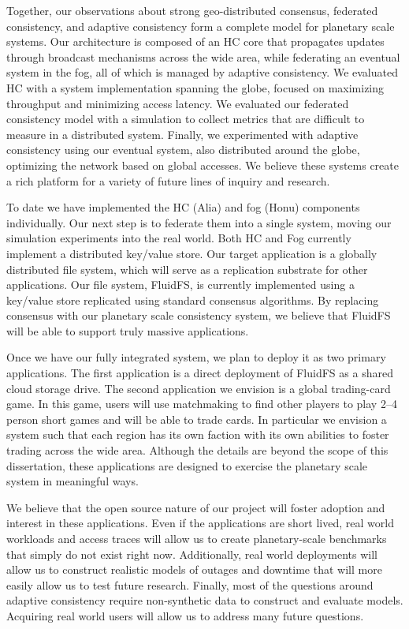 Together, our observations about strong geo-distributed consensus, federated consistency, and adaptive consistency form a complete model for planetary scale systems.
Our architecture is composed of an HC core that propagates updates through broadcast mechanisms across the wide area, while federating an eventual system in the fog, all of which is managed by adaptive consistency.
We evaluated HC with a system implementation spanning the globe, focused on maximizing throughput and minimizing access latency.
We evaluated our federated consistency model with a simulation to collect metrics that are difficult to measure in a distributed system.
Finally, we experimented with adaptive consistency using our eventual system, also distributed around the globe, optimizing the network based on global accesses.
We believe these systems create a rich platform for a variety of future lines of inquiry and research.

To date we have implemented the HC (Alia) and fog (Honu) components individually.
Our next step is to federate them into a single system, moving our simulation experiments into the real world.
Both HC and Fog currently implement a distributed key/value store.
Our target application is a globally distributed file system, which will serve as a replication substrate for other applications.
Our file system, FluidFS, is currently implemented using a key/value store replicated using standard consensus algorithms.
By replacing consensus with our planetary scale consistency system, we believe that FluidFS will be able to support truly massive applications.

Once we have our fully integrated system, we plan to deploy it as two primary applications.
The first application is a direct deployment of FluidFS as a shared cloud storage drive.
The second application we envision is a global trading-card game.
In this game, users will use matchmaking to find other players to play 2--4 person short games and will be able to trade cards.
In particular we envision a system such that each region has its own faction with its own abilities to foster trading across the wide area.
Although the details are beyond the scope of this dissertation, these applications are designed to exercise the planetary scale system in meaningful ways.

We believe that the open source nature of our project will foster adoption and interest in these applications.
Even if the applications are short lived, real world workloads and access traces will allow us to create planetary-scale benchmarks that simply do not exist right now.
Additionally, real world deployments will allow us to construct realistic models of outages and downtime that will more easily allow us to test future research.
Finally, most of the questions around adaptive consistency require non-synthetic data to construct and evaluate models.
Acquiring real world users will allow us to address many future questions.

